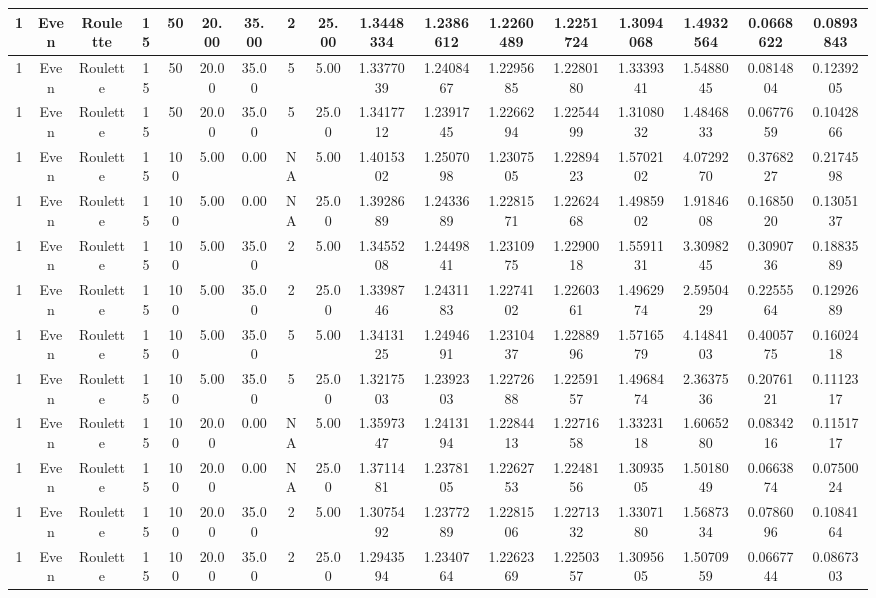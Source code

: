 \begin{longtable}{ | c | c | c | c | c | c | c | c | c | c | c | c | c | c | c | c | c | }
	\hline
	1	&	Even	&	Roulette	&	15	&	50	&	20.00	&	35.00	&	2	&	25.00	&	1.3448334	&	1.2386612	&	1.2260489	&	1.2251724	&	1.3094068	&	1.4932564	&	0.0668622	&	0.0893843 \\
	\hline
	1	&	Even	&	Roulette	&	15	&	50	&	20.00	&	35.00	&	5	&	5.00	&	1.3377039	&	1.2408467	&	1.2295685	&	1.2280180	&	1.3339341	&	1.5488045	&	0.0814804	&	0.1239205 \\
	\hline
	1	&	Even	&	Roulette	&	15	&	50	&	20.00	&	35.00	&	5	&	25.00	&	1.3417712	&	1.2391745	&	1.2266294	&	1.2254499	&	1.3108032	&	1.4846833	&	0.0677659	&	0.1042866 \\
	\hline
	1	&	Even	&	Roulette	&	15	&	100	&	5.00	&	0.00	&	NA	&	5.00	&	1.4015302	&	1.2507098	&	1.2307505	&	1.2289423	&	1.5702102	&	4.0729270	&	0.3768227	&	0.2174598 \\
	\hline
	1	&	Even	&	Roulette	&	15	&	100	&	5.00	&	0.00	&	NA	&	25.00	&	1.3928689	&	1.2433689	&	1.2281571	&	1.2262468	&	1.4985902	&	1.9184608	&	0.1685020	&	0.1305137 \\
	\hline
	1	&	Even	&	Roulette	&	15	&	100	&	5.00	&	35.00	&	2	&	5.00	&	1.3455208	&	1.2449841	&	1.2310975	&	1.2290018	&	1.5591131	&	3.3098245	&	0.3090736	&	0.1883589 \\
	\hline
	1	&	Even	&	Roulette	&	15	&	100	&	5.00	&	35.00	&	2	&	25.00	&	1.3398746	&	1.2431183	&	1.2274102	&	1.2260361	&	1.4962974	&	2.5950429	&	0.2255564	&	0.1292689 \\
	\hline
	1	&	Even	&	Roulette	&	15	&	100	&	5.00	&	35.00	&	5	&	5.00	&	1.3413125	&	1.2494691	&	1.2310437	&	1.2288996	&	1.5716579	&	4.1484103	&	0.4005775	&	0.1602418 \\
	\hline
	1	&	Even	&	Roulette	&	15	&	100	&	5.00	&	35.00	&	5	&	25.00	&	1.3217503	&	1.2392303	&	1.2272688	&	1.2259157	&	1.4968474	&	2.3637536	&	0.2076121	&	0.1112317 \\
	\hline
	1	&	Even	&	Roulette	&	15	&	100	&	20.00	&	0.00	&	NA	&	5.00	&	1.3597347	&	1.2413194	&	1.2284413	&	1.2271658	&	1.3323118	&	1.6065280	&	0.0834216	&	0.1151717 \\
	\hline
	1	&	Even	&	Roulette	&	15	&	100	&	20.00	&	0.00	&	NA	&	25.00	&	1.3711481	&	1.2378105	&	1.2262753	&	1.2248156	&	1.3093505	&	1.5018049	&	0.0663874	&	0.0750024 \\
	\hline
	1	&	Even	&	Roulette	&	15	&	100	&	20.00	&	35.00	&	2	&	5.00	&	1.3075492	&	1.2377289	&	1.2281506	&	1.2271332	&	1.3307180	&	1.5687334	&	0.0786096	&	0.1084164 \\
	\hline
	1	&	Even	&	Roulette	&	15	&	100	&	20.00	&	35.00	&	2	&	25.00	&	1.2943594	&	1.2340764	&	1.2262369	&	1.2250357	&	1.3095605	&	1.5070959	&	0.0667744	&	0.0867303 \\

\end{longtable}
